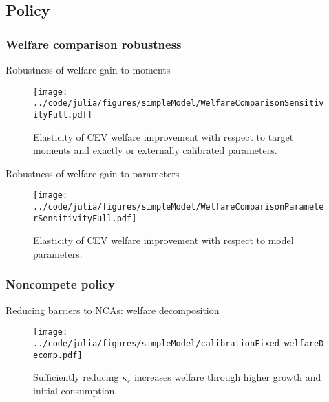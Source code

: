 \documentclass[english,usenames,dvipsnames]{beamer}
\begin{document}
\subsection{Policy}

\subsubsection{Welfare comparison robustness}

\begin{frame}{Robustness of welfare gain to moments}\label{robustness_to_moments}
\hyperlink{reducing_kappa_c_table}{}
	\begin{figure}
		\texttt{[image: ../code/julia/figures/simpleModel/WelfareComparisonSensitivityFull.pdf]}
		\caption{Elasticity of CEV welfare improvement with respect to target moments and exactly or externally calibrated parameters.}
		\label{WelfareComparisonSensitivityFull}
	\end{figure}
\end{frame}

\begin{frame}{Robustness of welfare gain to parameters}\label{robustness_to_parameters}
	\hyperlink{reducing_kappa_c_table}{}
	\begin{figure}
		\texttt{[image: ../code/julia/figures/simpleModel/WelfareComparisonParameterSensitivityFull.pdf]}
		\caption{Elasticity of CEV welfare improvement with respect to model parameters.}
		\label{WelfareComparisonSensitivityFull}
	\end{figure}
\end{frame}


\subsubsection{Noncompete policy}


\begin{frame}{Reducing barriers to NCAs: welfare decomposition} \label{plots:reducing_kappa_c1} 
	\hyperlink{reducing_kappa_c_table}{}
	\begin{figure}[]
		\texttt{[image: ../code/julia/figures/simpleModel/calibrationFixed\_welfareDecomp.pdf]}
		\caption{Sufficiently reducing $\kappa_c$ increases welfare through higher growth and initial consumption.}
	\end{figure}
\end{frame}
\end{document}
